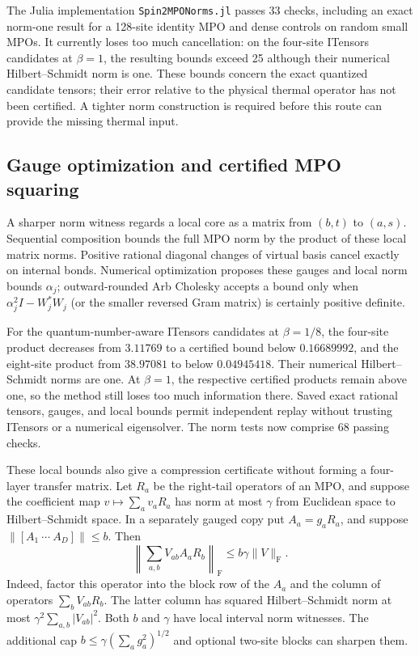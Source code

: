 \documentclass[11pt]{article}
\begin{document}
The Julia implementation \texttt{Spin2MPONorms.jl} passes 33 checks,
including an exact norm-one result for a 128-site identity MPO and dense
controls on random small MPOs. It currently loses too much cancellation:
on the four-site ITensors candidates at $\beta=1$, the resulting bounds
exceed 25 although their numerical Hilbert--Schmidt norm is one.
These bounds concern the exact quantized candidate tensors; their error
relative to the physical thermal operator has not been certified.
A tighter norm construction is required before this route can provide
the missing thermal input.

\subsection{Gauge optimization and certified MPO squaring}
A sharper norm witness regards a local core as a matrix from
$(b,t)$ to $(a,s)$. Sequential composition bounds the full MPO norm by
the product of these local matrix norms. Positive rational diagonal
changes of virtual basis cancel exactly on internal bonds. Numerical
optimization proposes these gauges and local norm bounds $\alpha_j$;
outward-rounded Arb Cholesky accepts a bound only when
$\alpha_j^2 I-W_j^*W_j$ (or the smaller reversed Gram matrix) is
certainly positive definite.

For the quantum-number-aware ITensors candidates at $\beta=1/8$, the
four-site product decreases from $3.11769$ to a certified bound below
$0.16689992$, and the eight-site product from $38.97081$ to below
$0.04945418$. Their numerical Hilbert--Schmidt norms are one.
At $\beta=1$, the respective certified products remain above one,
so the method still loses too much information there. Saved exact
rational tensors, gauges, and local bounds permit independent replay
without trusting ITensors or a numerical eigensolver. The norm tests
now comprise 68 passing checks.

These local bounds also give a compression certificate without forming
a four-layer transfer matrix. Let $R_a$ be the right-tail operators of
an MPO, and suppose the coefficient map
$v\mapsto\sum_a v_a R_a$ has norm at most $\gamma$ from Euclidean
space to Hilbert--Schmidt space. In a separately gauged copy put
$A_a=g_aR_a$, and suppose $\|[A_1\ \cdots\ A_D]\|\le b$. Then
\[
 \left\|\sum_{a,b}V_{ab}A_aR_b\right\|_{\mathrm F}
 \le b\gamma\|V\|_{\mathrm F}.
\]
Indeed, factor this operator into the block row of the $A_a$ and the
column of operators $\sum_bV_{ab}R_b$. The latter column has squared
Hilbert--Schmidt norm at most $\gamma^2\sum_{a,b}|V_{ab}|^2$.
Both $b$ and $\gamma$ have local interval norm witnesses.
The additional cap $b\le\gamma(\sum_a g_a^2)^{1/2}$ and optional
two-site blocks can sharpen them.
\end{document}
